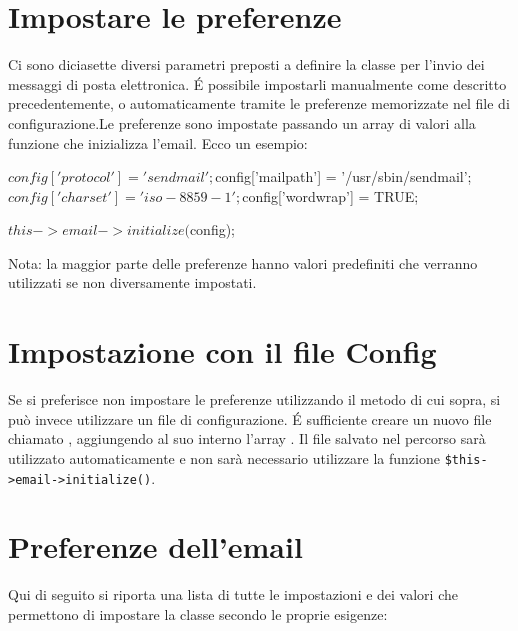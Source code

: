 \section*{Impostare le preferenze}
Ci sono diciasette diversi parametri preposti a definire la classe per l'invio dei messaggi di posta elettronica. \'E possibile impostarli manualmente come descritto precedentemente, o automaticamente tramite le preferenze memorizzate nel file di configurazione.Le preferenze sono impostate passando un array di valori alla funzione che inizializza l'email. Ecco un esempio:

\begin{code}
$config['protocol'] = 'sendmail';
$config['mailpath'] = '/usr/sbin/sendmail';
$config['charset'] = 'iso-8859-1';
$config['wordwrap'] = TRUE;

$this->email->initialize($config);
\end{code}

Nota: la maggior parte delle preferenze hanno valori predefiniti che verranno utilizzati se non diversamente impostati.

\section*{Impostazione con il file Config}
Se si preferisce non impostare le preferenze utilizzando il metodo di cui sopra, si può invece utilizzare un file di configurazione. \'E sufficiente creare un nuovo file chiamato , aggiungendo al suo interno l'array . Il file salvato nel percorso  sarà utilizzato automaticamente e non sarà necessario utilizzare la funzione \verb|$this->email->initialize()|.

\section*{Preferenze dell'email}
Qui di seguito si riporta una lista di tutte le impostazioni e dei valori che permettono di impostare la classe secondo le proprie esigenze:

